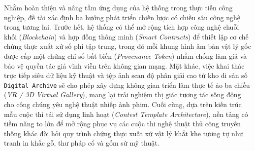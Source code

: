 Nhằm hoàn thiện và nâng tầm ứng dụng của hệ thống trong thực tiễn công nghiệp, đề tài xác định ba hướng phát triển chiến lược có chiều sâu công nghệ trong tương lai. Trước hết, hệ thống có thể mở rộng tích hợp công nghệ chuỗi khối (\textit{Blockchain}) và hợp đồng thông minh (\textit{Smart Contracts}) để thiết lập cơ chế chứng thực xuất xứ số phi tập trung, trong đó mỗi khung hình âm bản vật lý gốc được cấp một chứng chỉ số bất biến (\textit{Provenance Token}) nhằm chống làm giả và bảo vệ quyền tác giả vĩnh viễn trên không gian mạng. Mặt khác, việc khai thác trực tiếp siêu dữ liệu kỹ thuật và tệp ảnh scan độ phân giải cao từ kho di sản số \texttt{Digital Archive} sẽ cho phép xây dựng không gian triển lãm thực tế ảo ba chiều (\textit{VR / 3D Virtual Gallery}), mang lại trải nghiệm thị giác tương tác sống động cho công chúng yêu nghệ thuật nhiếp ảnh phim. Cuối cùng, dựa trên kiến trúc mẫu cuộc thi tái sử dụng linh hoạt (\textit{Contest Template Architecture}), nền tảng có tiềm năng to lớn để mở rộng phục vụ các cuộc thi nghệ thuật thủ công truyền thống khác đòi hỏi quy trình chứng thực xuất xứ vật lý khắt khe tương tự như tranh in khắc gỗ, thư pháp cổ và gốm sứ mỹ thuật.
